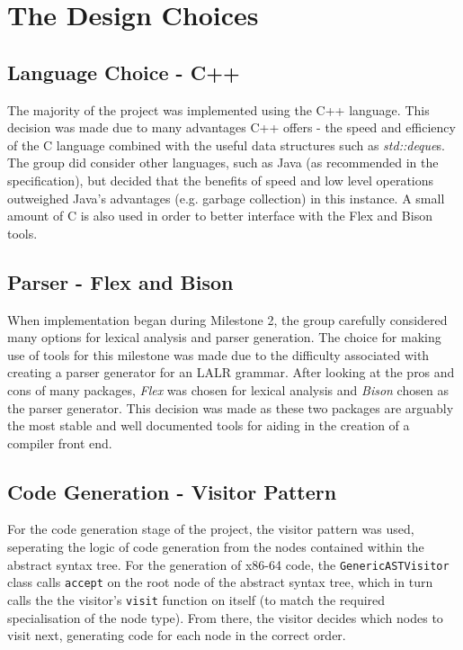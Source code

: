\documentclass[a4wide, 11pt]{article}
\begin{document}
\section{The Design Choices}

\subsection{Language Choice - C++}
The majority of the project was implemented using the C++ language. This
decision was made due to many advantages C++ offers - the speed and
efficiency of the C language combined with the useful data structures such
as \emph{std::deque}s. The group did consider other languages, such as Java (as
recommended in the specification), but decided that the benefits of speed and
low level operations outweighed Java's advantages (e.g. garbage collection) in
this instance. A small amount of C is also used in order to better interface
with the Flex and Bison tools.

\subsection{Parser - Flex and Bison}

When implementation began during Milestone 2, the group carefully considered
many options for lexical analysis and parser generation. The choice for making 
use of tools for this milestone was made due to the difficulty associated with
creating a parser generator for an LALR grammar. After looking at the
pros and cons of many packages, \emph{Flex} was chosen for lexical analysis
and \emph{Bison} chosen as the parser generator. This decision was made as 
these two packages are arguably the most stable and well documented tools for 
aiding in the creation of a compiler front end.

\subsection{Code Generation - Visitor Pattern}

For the code generation stage of the project, the visitor pattern was used, 
seperating the logic of code generation from the nodes contained within the
abstract syntax tree. For the generation of x86-64 code, the
\texttt{GenericASTVisitor}
class calls \texttt{accept} on the root node of the abstract syntax tree, which
in turn calls the the visitor's \texttt{visit} function on itself (to match
the required specialisation of the node type). From there, the visitor decides
which nodes to visit next, generating code for each node in the correct order. 
\end{document}

